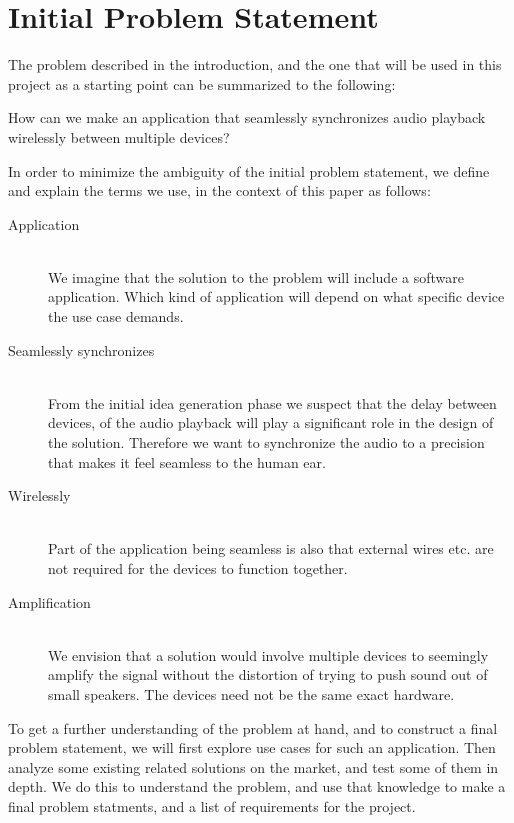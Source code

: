 \section{Initial Problem Statement}\label{sec:initial_problem}

The problem described in the introduction, and the one that will be used
in this project as a starting point can be summarized to the following:

\begin{problemstatement}
	How can we make an application that seamlessly synchronizes audio
	playback wirelessly between multiple devices?
\end{problemstatement}

\noindent
In order to minimize the ambiguity of the initial problem statement, 
we define and explain the terms we use, in the context of this paper as follows:

\begin{description}
	\item[Application] \hfill \\
		We imagine that the solution to the problem will include a software
		application. Which kind of application will depend on what specific
		device the use case demands. 
	\item[Seamlessly synchronizes]  \hfill \\
		From the initial idea generation phase we suspect
		that the delay between devices, of the audio playback will
		play a significant role in the design of the solution. Therefore we
		want to synchronize the audio to a precision that makes it feel
		seamless to the human ear.
	\item[Wirelessly]  \hfill \\
		Part of the application being seamless is also that external wires etc. are
		not required for the devices to function together.
	\item[Amplification]  \hfill \\
		We envision that a solution would involve multiple devices to seemingly 
		amplify the signal without the distortion of trying to push sound out of
		small speakers. The devices need not be the same exact hardware.
\end{description}

To get a further understanding of the problem at hand, and to
construct a final problem statement, we will first explore use
cases for such an application. 
Then analyze some existing related solutions on the market, 
and test some of them in depth. 
We do this to understand the problem, and use that knowledge
to make a final problem statments, and a list of requirements for the project. 
